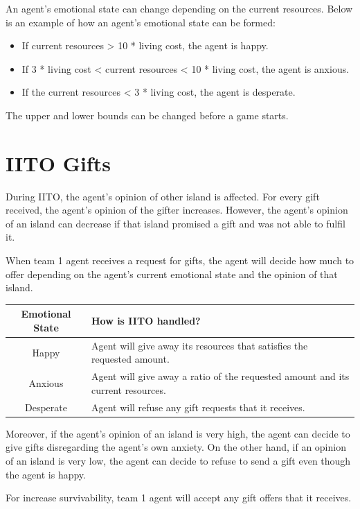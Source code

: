 An agent's emotional state can change depending on the current resources. Below is an example of how an agent's emotional state can be formed:
\begin{itemize}
    \item If current resources > 10 * living cost, the agent is happy.
    \item If 3 * living cost < current resources < 10 * living cost, the agent is anxious.
    \item If the current resources < 3 * living cost, the agent is desperate.
\end{itemize}
The upper and lower bounds can be changed before a game starts. 

\section{IITO Gifts}
During IITO, the agent's opinion of other island is affected. For every gift received, the agent's opinion of the gifter increases. However, the agent's opinion of an island can decrease if that island promised a gift and was not able to fulfil it. 

When team 1 agent receives a request for gifts, the agent will decide how much to offer depending on the agent's current emotional state and the opinion of that island. 

\begin{table} [htb]
    \centering
    \begin{tabular}{|c|p{}|}
        \hline
        Emotional State & How is IITO handled? \\
        \hline
        Happy & Agent will give away its resources that satisfies the requested amount. \\
        \hline
        Anxious & Agent will give away a ratio of the requested amount and its current resources. \\
        \hline
        Desperate & Agent will refuse any gift requests that it receives. \\ 
        \hline
    \end{tabular}
\end{table}

Moreover, if the agent's opinion of an island is very high, the agent can decide to give gifts disregarding the agent's own anxiety. On the other hand, if an opinion of an island is very low, the agent can decide to refuse to send a gift even though the agent is happy. 

For increase survivability, team 1 agent will accept any gift offers that it receives. 

